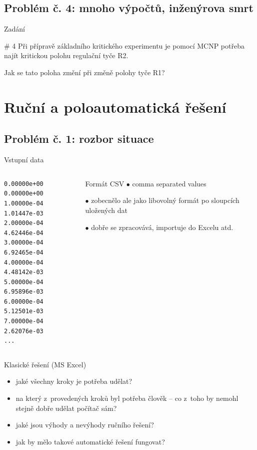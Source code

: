 \documentclass{beamer}
\begin{document}
\subsection{Problém č. 4: mnoho výpočtů, inženýrova smrt}

\begin{frame}{Zadání}
  \begin{block}{\# 4}
    Při přípravě základního kritického experimentu je pomocí MCNP potřeba najít kritickou polohu regulační tyče R2.

    Jak se tato poloha změní při změně polohy tyče R1?
  \end{block}
\end{frame}

\section{Ruční a poloautomatická řešení}

\subsection{Problém č. 1: rozbor situace}

\begin{frame}[fragile]{Vstupní data}
  \begin{columns}
      {\scriptsize
      \begin{verbatim}
0.00000e+00 0.00000e+00
1.00000e-04 1.01447e-03
2.00000e-04 4.62446e-04
3.00000e-04 6.92465e-04
4.00000e-04 4.48142e-03
5.00000e-04 6.95896e-03
6.00000e-04 5.12501e-03
7.00000e-04 2.62076e-03
...
      \end{verbatim}
      }
      \begin{block}{Formát CSV}
        $\bullet$ comma separated values

        $\bullet$ zobecnělo ale jako libovolný formát po sloupcích uložených dat

        $\bullet$ dobře se zpracovává, importuje do Excelu atd.
      \end{block}
  \end{columns}
\end{frame}

\begin{frame}{Klasické řešení (MS Excel)}
  \begin{itemize}
    \item jaké všechny kroky je potřeba udělat?
    \item na který z~provedených kroků byl potřeba člověk -- co z~toho by nemohl stejně dobře udělat počítač sám?
    \item jaké jsou výhody a nevýhody ručního řešení?
    \item jak by mělo takové automatické řešení fungovat?
  \end{itemize}
\end{frame}
\end{document}
